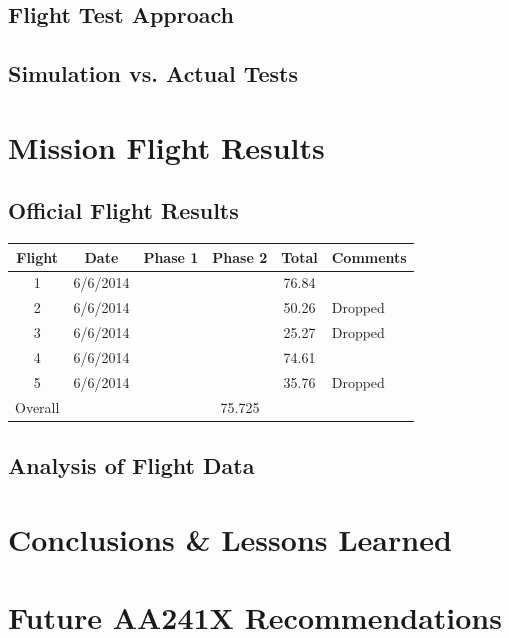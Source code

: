 \documentclass[11pt]{article}
\begin{document}
\subsection{Flight Test Approach}
\label{FltTstAppr}
\subsection{Simulation vs. Actual Tests}
\label{simvsact}

\section{Mission Flight Results}
\label{MissionFlightResults}
\subsection{Official Flight Results}
\label{OffFltRes}
\begin{center}
    \begin{tabular}{ | c | c | c | c | c | p{3cm} |}
    \hline
    \textbf{Flight} & \textbf{Date} & \textbf{Phase 1} & \textbf{Phase 2} & \textbf{Total} & \textbf{Comments} \\ \hline
    1 & 6/6/2014 &  &  & 76.84 & \\ \hline
    2 & 6/6/2014 &  &  & 50.26 & Dropped\\ \hline
    3 & 6/6/2014 &  &  & 25.27 & Dropped\\ \hline
    4 & 6/6/2014 &  &  & 74.61 & \\ \hline
    5 & 6/6/2014 &  &  & 35.76 & Dropped\\ \hline
    Overall & \multicolumn{5}{c|}{75.725}\\ \hline   
    \end{tabular}
\end{center}

\subsection{Analysis of Flight Data}
\label{AnalFltData}


\section{Conclusions \& Lessons Learned}
\label{Conclusion}

\section{Future AA241X Recommendations}
\label{Recommendations}
\end{document}
